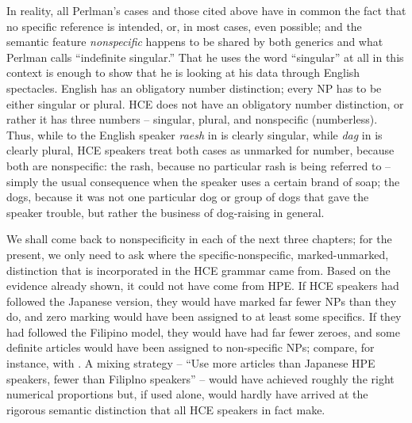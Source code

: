 In reality, all Perlman's cases and those cited above have in common the fact that no specific reference is intended, or, in most cases, even possible; and the semantic feature \textit{nonspecific} happens to be
shared by both generics and what Perlman calls ``indefinite singular.'' That he uses the word ``singular'' at all in this context is enough to show that he is looking at his data through English spectacles. English has an obligatory number distinction; every NP has to be either singular or plural. HCE does not have an obligatory number distinction, or rather it has three numbers -- singular, plural, and nonspecific (number\-less). Thus, while to the English speaker \textit{raesh} in  is clearly singular, while \textit{dag} in  is clearly plural, HCE speakers treat both cases as unmarked for number, because both are nonspecific: the rash, because no particular rash is being referred to -- simply the usual consequence when the speaker uses a certain brand of soap; the dogs, because it was not one particular dog or group of dogs that gave the speaker trouble, but rather the business of dog-raising in general.

We shall come back to nonspecificity in each of the next three chapters; for the present, we only need to ask where the specific-nonspecific, marked-unmarked, distinction that is incorporated in the HCE grammar came from. Based on the evidence already shown, it could not have come from HPE. If HCE speakers had followed the Japanese version, they would have marked far fewer NPs than they do, and zero marking would have been assigned to at least some specifics. If they had followed the Filipino model, they would have had far fewer zeroes, and some definite articles would have been assigned to non-specific NPs; compare, for instance,  with . A mixing strategy -- ``Use more articles than Japanese HPE speakers, fewer than Filiplno speakers'' -- would have achieved roughly the right numerical proportions but, if used alone, would hardly have arrived at the rigorous semantic distinction that all HCE speakers in fact make.

